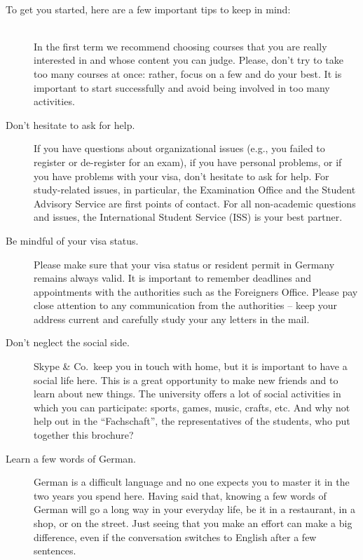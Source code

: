{    \

    To get you started, here are a few important tips to keep in mind:
    \\ \\
    \begin{description}
        \item[\parbox{\textwidth}{Be focused in your studies, but not over- \\
        ambitious.}]
            In the first term we recommend choosing courses that you are really interested in and whose content you can judge.
            Please, don't try to take too many courses at once: rather, focus on a few and do your best.
            It is important to start successfully and avoid being involved in too many activities.
        \item[Don't hesitate to ask for help.]
            If you have questions about organizational issues (e.g., you failed to register or de-register for an exam), if you have personal problems, or if you have problems with your visa, don't hesitate to ask for help.
            For study-related issues, in particular, the Examination Office and the Student Advisory Service are first points of contact.
            For all non-academic questions and issues, the International Student Service (ISS) is your best partner.
        \item[Be mindful of your visa status.]
            Please make sure that your visa status or resident permit in Germany remains always valid.
            It is important to remember deadlines and appointments with the authorities such as the Foreigners Office.
            Please pay close attention to any communication from the authorities -- keep your address current and carefully study your any letters in the mail.
        \item[Don't neglect the social side.]
            Skype \& Co.\ keep you in touch with home, but it is important to have a social life here.
            This is a great opportunity to make new friends and to learn about new things.
            The university offers a lot of social activities in which you can participate: sports, games, music, crafts, etc.
            And why not help out in the ``Fachschaft'', the representatives of the students, who put together this brochure?
        \item[Learn a few words of German.]
            German is a difficult language and no one expects you to master it in the two years you spend here.
            Having said that, knowing a few words of German will go a long way in your everyday life, be it in a restaurant, in a shop, or on the street.
            Just seeing that you make an effort can make a big difference, even if the conversation switches to English after a few sentences.
    \end{description}

}
